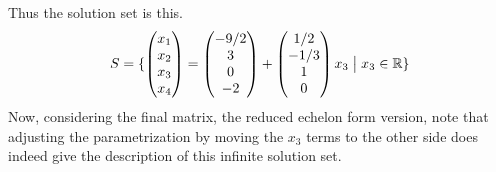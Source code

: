 Thus the solution set is this.
\begin{equation*}  
  S=\mbox{$\{\begin{pmatrix} x_1 \\ x_2 \\ x_3 \\ x_4 \end{pmatrix}
                        =\begin{pmatrix} -9/2 \\ 3 \\ 0 \\ -2 \end{pmatrix}
                         +\begin{pmatrix} 1/2 \\ -1/3 \\ 1 \\ 0 \end{pmatrix}x_3
                        \bigm| x_3\in\mathbb{R}\}$}
\end{equation*}
Now, considering the final matrix, the reduced echelon form version, note that
adjusting the parametrization by moving the $x_3$ terms to the other side
does indeed give the description of this infinite solution set.

